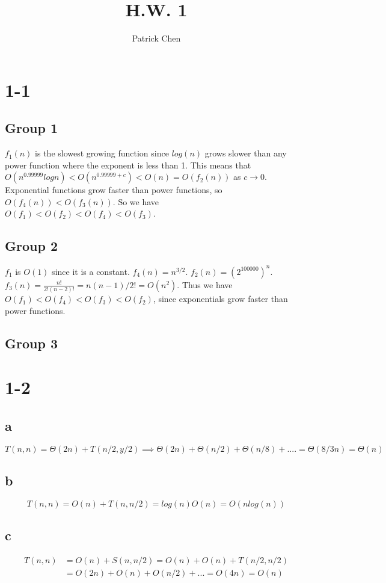 \documentclass[10pt,a4paper]{article}
\title{H.W. 1}
\author{Patrick Chen}
\begin{document}
\maketitle
\tableofcontents
\section{1-1}
\subsection*{Group 1}
$f_1(n)$ is the slowest growing function since $log(n)$ grows slower than any power function where the exponent is less than 1. This means that $O(n^{0.99999}logn) < O(n^{0.99999 + c}) < O(n) = O(f_2(n))$ as $c \rightarrow 0$. Exponential functions grow faster than power functions, so $O(f_4(n)) < O(f_3(n))$. So we have $O(f_1)<O(f_2)<O(f_4)<O(f_3)$.
\subsection*{Group 2}
$f_1$ is $O(1)$ since it is a constant. $f_4(n)= n^{3/2}$. $f_2(n)=(2^{100000})^n$. $f_3(n)=\frac{n!}{2!(n-2)!}=n(n-1)/2!=O(n^2)$. Thus we have $O(f_1)<O(f_4)<O(f_3)<O(f_2)$, since exponentials grow faster than power functions.
\subsection*{Group 3}
\section{1-2}
\subsection*{a}
$T(n,n)=\Theta(2n)+T(n/2,y/2) \implies \Theta(2n)+\Theta(n/2)+\Theta(n/8)+....=\Theta(8/3n)=\Theta(n) $ 
\subsection*{b}
\begin{equation}
T(n,n)= O(n)+T(n,n/2) = log(n) O(n)= O(nlog(n))
\end{equation}
\subsection*{c}
\begin{align}
T(n,n) & =O(n)+S(n,n/2)=O(n)+O(n)+T(n/2,n/2) \\
& =O(2n)+O(n)+O(n/2)+...= O(4n)=O(n)
\end{align}
\end{document}
